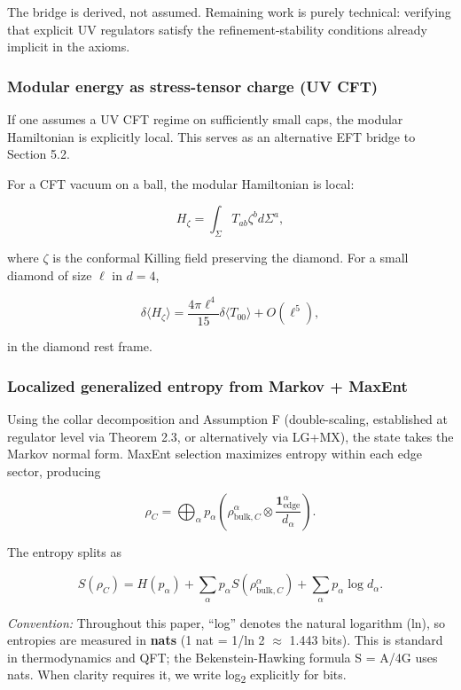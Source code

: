 \documentclass[11pt,a4paper]{article}
\theoremstyle{remark}
\begin{document}
The bridge is derived, not assumed. Remaining work is purely technical:
verifying that explicit UV regulators satisfy the refinement-stability
conditions already implicit in the axioms.

\subsubsection{Modular energy as stress-tensor charge (UV CFT)}\label{modular-energy-as-stress-tensor-charge-uv-cft}

If one assumes a UV CFT regime on sufficiently small caps, the modular
Hamiltonian is explicitly local. This serves as an alternative EFT bridge to
Section 5.2.

For a CFT vacuum on a ball, the modular Hamiltonian is local:

\[
H_{\zeta} = \int_{\Sigma} T_{ab} \zeta^b d\Sigma^a,
\]

where \(\zeta\) is the conformal Killing field preserving the diamond. For a small
diamond of size \(\ell\) in \(d=4\),

\[
\delta \langle H_{\zeta} \rangle = \frac{4 \pi \ell^4}{15} \delta \langle T_{00} \rangle + O(\ell^5),
\]

in the diamond rest frame.

\subsubsection{Localized generalized entropy from Markov + MaxEnt}\label{localized-generalized-entropy-from-markov-maxent}

Using the collar decomposition and Assumption F (double-scaling, established
at regulator level via Theorem 2.3, or alternatively via LG+MX), the state
takes the Markov normal form. MaxEnt selection
maximizes entropy within each edge sector,
producing

\[
\rho_C = \bigoplus_{\alpha} p_{\alpha}
\left(\rho_{\mathrm{bulk},C}^{\alpha} \otimes \frac{\mathbf 1_{\mathrm{edge}}^{\alpha}}{d_{\alpha}}\right).
\]

The entropy splits as

\[
S(\rho_C) = H(p_{\alpha}) + \sum_{\alpha} p_{\alpha} S(\rho_{\mathrm{bulk},C}^{\alpha}) + \sum_{\alpha} p_{\alpha} \log d_{\alpha}.
\]

\emph{Convention:} Throughout this paper, ``log'' denotes the natural logarithm (ln),
so entropies are measured in \textbf{nats} (1 nat = 1/ln 2 \ensuremath{\approx} 1.443 bits). This is
standard in thermodynamics and QFT; the Bekenstein-Hawking formula S = A/4G
uses nats. When clarity requires it, we write log\textsubscript{2} explicitly for bits.
\end{document}
